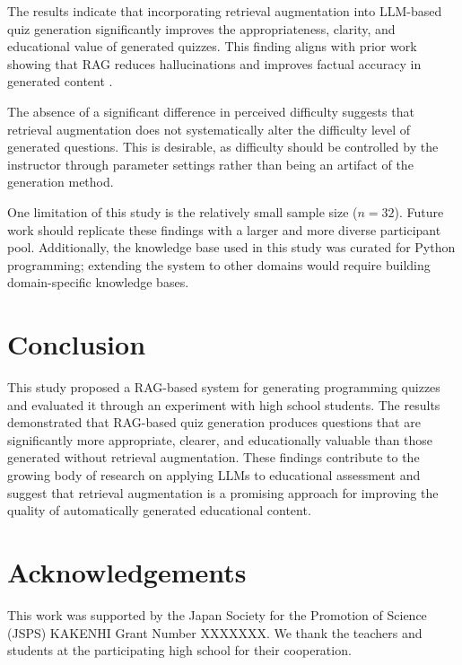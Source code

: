 \documentclass[11pt,a4paper]{article}
\begin{document}
The results indicate that incorporating retrieval augmentation into LLM-based quiz generation significantly improves the appropriateness, clarity, and educational value of generated quizzes. This finding aligns with prior work showing that RAG reduces hallucinations and improves factual accuracy in generated content \parencite{wang2024}.

The absence of a significant difference in perceived difficulty suggests that retrieval augmentation does not systematically alter the difficulty level of generated questions. This is desirable, as difficulty should be controlled by the instructor through parameter settings rather than being an artifact of the generation method.

One limitation of this study is the relatively small sample size ($n = 32$). Future work should replicate these findings with a larger and more diverse participant pool. Additionally, the knowledge base used in this study was curated for Python programming; extending the system to other domains would require building domain-specific knowledge bases.

\section{Conclusion}

This study proposed a RAG-based system for generating programming quizzes and evaluated it through an experiment with high school students. The results demonstrated that RAG-based quiz generation produces questions that are significantly more appropriate, clearer, and educationally valuable than those generated without retrieval augmentation. These findings contribute to the growing body of research on applying LLMs to educational assessment and suggest that retrieval augmentation is a promising approach for improving the quality of automatically generated educational content.

\section*{Acknowledgements}

This work was supported by the Japan Society for the Promotion of Science (JSPS) KAKENHI Grant Number XXXXXXX. We thank the teachers and students at the participating high school for their cooperation.

\printbibliography[title={References}]
\end{document}
